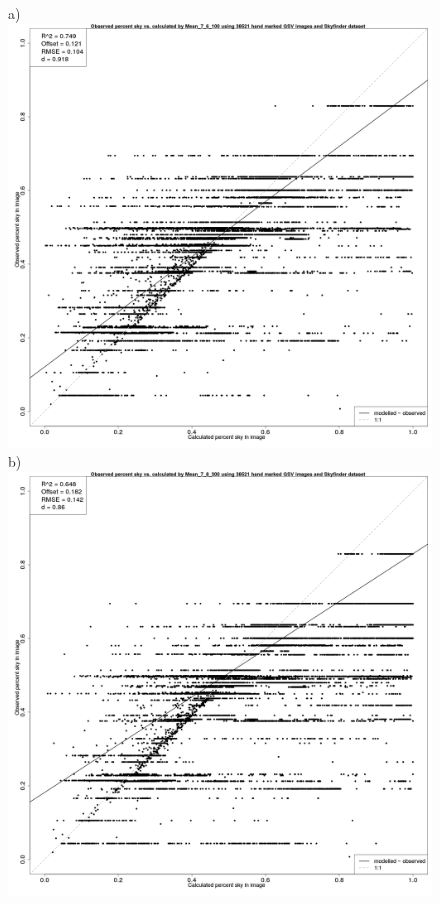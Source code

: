 \documentclass[final,3p,times,authoryear]{elsarticle}
\begin{document}
\begin{figure}
\centering
a)\includegraphics[scale=0.12]{Images/ErrorPlotsCombinedIndivMean_7_6_100.png}
b)\includegraphics[scale=0.12]{Images/ErrorPlotsCombinedIndivMean_7_8_300.png}

\end{figure}
\end{document}
